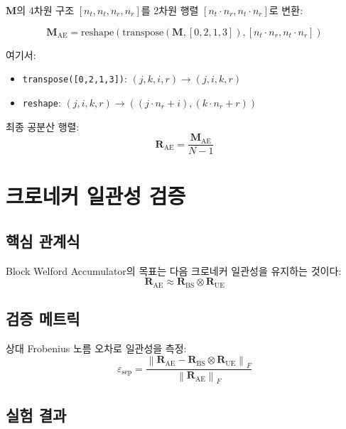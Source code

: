 \documentclass[10pt]{article}
\begin{document}
$\mathbf{M}$의 4차원 구조 $[n_t, n_t, n_r, n_r]$를 2차원 행렬 $[n_t \cdot n_r, n_t \cdot n_r]$로 변환:

\begin{equation}
\mathbf{M}_{\text{AE}} = \text{reshape}\left(\text{transpose}(\mathbf{M}, [0,2,1,3]), [n_t \cdot n_r, n_t \cdot n_r]\right)
\end{equation}

여기서:
\begin{itemize}
    \item \texttt{transpose([0,2,1,3])}: $(j,k,i,r) \rightarrow (j,i,k,r)$
    \item \texttt{reshape}: $(j,i,k,r) \rightarrow ((j \cdot n_r + i), (k \cdot n_r + r))$
\end{itemize}

최종 공분산 행렬:
\begin{equation}
\mathbf{R}_{\text{AE}} = \frac{\mathbf{M}_{\text{AE}}}{N-1}
\end{equation}

\section{크로네커 일관성 검증}

\subsection{핵심 관계식}

Block Welford Accumulator의 목표는 다음 크로네커 일관성을 유지하는 것이다:
\begin{equation}
\boxed{\mathbf{R}_{\text{AE}} \approx \mathbf{R}_{\text{BS}} \otimes \mathbf{R}_{\text{UE}}}
\end{equation}

\subsection{검증 메트릭}

상대 Frobenius 노름 오차로 일관성을 측정:
\begin{equation}
\varepsilon_{\text{sep}} = \frac{\left\|\mathbf{R}_{\text{AE}} - \mathbf{R}_{\text{BS}} \otimes \mathbf{R}_{\text{UE}}\right\|_F}{\left\|\mathbf{R}_{\text{AE}}\right\|_F}
\end{equation}

\subsection{실험 결과}
\end{document}
